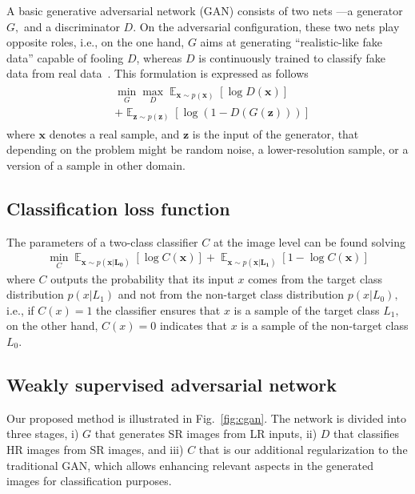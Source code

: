 \documentclass[10pt,twocolumn,letterpaper]{article}
\DeclareMathOperator*{\E}{\mathbb{E}}
\providecommand{\ve}[1]{{\bm{#1}}} %
\begin{document}
A basic generative adversarial network (GAN) consists of two nets ---a generator $G,$ and a discriminator $D$. On the adversarial configuration, these two nets play opposite roles, i.e., on the one hand, $G$ aims at generating ``realistic-like fake data'' capable of fooling $D$, whereas $D$ is continuously trained to classify fake data from real data~\cite{Goodfellow2014}. This formulation is expressed as follows
\begin{eqnarray}
\label{eq:gan}
\begin{aligned}
& \min_G \max_D \E_{\ve{x} \sim p(\ve{x})}[\log D(\ve{x})]\\
& +\E_{\ve{z} \sim p(\ve{z})}[\log (1 - D(G(\ve{z})))]  
\end{aligned}
\end{eqnarray}
where $\ve{x}$ denotes a real sample, and $\ve{z}$ is the input of the generator, that depending on the problem might be random noise, a lower-resolution sample, or a version of a sample in other domain.

\subsection{Classification loss function}
The parameters of a two-class classifier $C$ at the image level can be found solving
\begin{eqnarray}
\label{eq:cnet}
\min_C \E_{\ve{x} \sim p(\ve{x|L_0})}[\log C(\ve{x})] +  \E_{\ve{x} \sim p(\ve{x|L_1})}[1-\log C(\ve{x})]
\end{eqnarray}
where $C$ outputs the probability that its input $x$ comes from the target class distribution $p(x|L_1)$ and not from the non-target class distribution $p(x|L_0),$ i.e., if $C(x)=1$ the classifier ensures that $x$ is a sample of the target class $L_1,$ on the other hand, $C(x)=0$ indicates that $x$ is a sample of the non-target class $L_0$.

\subsection{Weakly supervised adversarial network}

Our proposed method is illustrated in Fig.~\ref{fig:cgan}. The network is divided into three stages, i) $G$ that generates SR images from LR inputs, ii) $D$ that classifies HR images from SR images, and iii) $C$ that is our additional regularization to the traditional GAN, which allows enhancing relevant aspects in the generated images for classification purposes. 
\end{document}
